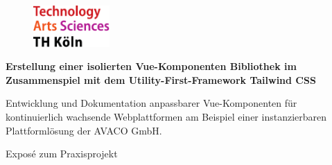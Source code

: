 \begin{titlepage}

\begin{center}

\begin{figure}[!ht]
		\includegraphics[width=0.26\textwidth]{images/THlogoheader.pdf}
\end{figure}

\vspace{1.5cm}

\begin{rmfamily}
\begin{huge}
\textbf{ Erstellung einer isolierten Vue-Komponenten Bibliothek im Zusammenspiel mit dem Utility-First-Framework Tailwind CSS}\\	
\end{huge}
\vspace{0.5cm}
\begin{LARGE}
Entwicklung und Dokumentation anpassbarer Vue-Komponenten für kontinuierlich wachsende Webplattformen am Beispiel einer instanzierbaren Plattformlösung der AVACO GmbH. \\
\end{LARGE}
\end{rmfamily}

\vspace{0.8cm}



\begin{LARGE}
\begin{scshape}
Exposé zum Praxisprojekt\\[0.8em]
\end{scshape}
\end{LARGE}


\end{center}
\end{titlepage}
